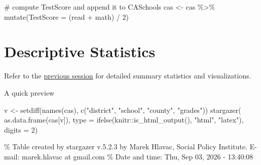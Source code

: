 \documentclass[
  12pt,
  letterpaper,
]{scrbook}
\newenvironment{Shaded}{\begin{snugshade}}{\end{snugshade}}
\newcommand{\AttributeTok}[1]{\textcolor[rgb]{0.40,0.45,0.13}{#1}}
\newcommand{\CommentTok}[1]{\textcolor[rgb]{0.37,0.37,0.37}{#1}}
\newcommand{\DecValTok}[1]{\textcolor[rgb]{0.68,0.00,0.00}{#1}}
\newcommand{\FunctionTok}[1]{\textcolor[rgb]{0.28,0.35,0.67}{#1}}
\newcommand{\NormalTok}[1]{\textcolor[rgb]{0.00,0.23,0.31}{#1}}
\newcommand{\OtherTok}[1]{\textcolor[rgb]{0.00,0.23,0.31}{#1}}
\newcommand{\SpecialCharTok}[1]{\textcolor[rgb]{0.37,0.37,0.37}{#1}}
\newcommand{\StringTok}[1]{\textcolor[rgb]{0.13,0.47,0.30}{#1}}
\theoremstyle{plain}
\theoremstyle{definition}
\theoremstyle{remark}
\begin{document}
\begin{Shaded}
\begin{Highlighting}[]
\CommentTok{\# compute TestScore and append it to CASchools}
\NormalTok{cas }\OtherTok{\textless{}{-}}\NormalTok{ cas }\SpecialCharTok{\%\textgreater{}\%}
  \FunctionTok{mutate}\NormalTok{(}\AttributeTok{TestScore =}\NormalTok{ (read }\SpecialCharTok{+}\NormalTok{ math) }\SpecialCharTok{/} \DecValTok{2}\NormalTok{)}
\end{Highlighting}
\end{Shaded}

\section{Descriptive Statistics}\label{descriptive-statistics}

Refer to the
\hyperref[descriptive-analysis-and-data-visualization-with-caschools]{previous
session} for detailed summary statistics and visualizations.

A quick preview

\begin{Shaded}
\begin{Highlighting}[]
\NormalTok{v }\OtherTok{\textless{}{-}} \FunctionTok{setdiff}\NormalTok{(}\FunctionTok{names}\NormalTok{(cas), }\FunctionTok{c}\NormalTok{(}\StringTok{"district"}\NormalTok{, }\StringTok{"school"}\NormalTok{, }\StringTok{"county"}\NormalTok{, }\StringTok{"grades"}\NormalTok{))}
\FunctionTok{stargazer}\NormalTok{(}
  \FunctionTok{as.data.frame}\NormalTok{(cas[v]), }
  \AttributeTok{type =} \FunctionTok{ifelse}\NormalTok{(knitr}\SpecialCharTok{::}\FunctionTok{is\_html\_output}\NormalTok{(), }\StringTok{"html"}\NormalTok{, }\StringTok{"latex"}\NormalTok{), }
  \AttributeTok{digits =} \DecValTok{2}\NormalTok{)}
\end{Highlighting}
\end{Shaded}

\% Table created by stargazer v.5.2.3 by Marek Hlavac, Social Policy
Institute. E-mail: marek.hlavac at gmail.com \% Date and time: Thu, Sep
03, 2026 - 13:40:08
\end{document}
